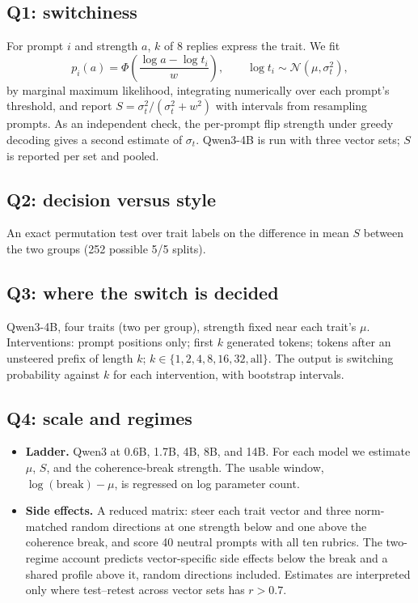 \documentclass[11pt]{article}
\begin{document}
\subsection{Q1: switchiness}
For prompt $i$ and strength $a$, $k$ of 8 replies express the trait. We fit
\[
  p_i(a) = \Phi\!\left(\frac{\log a - \log t_i}{w}\right),
  \qquad \log t_i \sim \mathcal{N}(\mu, \sigma_t^2),
\]
by marginal maximum likelihood, integrating numerically over each prompt's
threshold, and report $S = \sigma_t^2/(\sigma_t^2 + w^2)$ with intervals from
resampling prompts. As an independent check, the per-prompt flip strength under
greedy decoding gives a second estimate of $\sigma_t$. Qwen3-4B is run with
three vector sets; $S$ is reported per set and pooled.

\subsection{Q2: decision versus style}
An exact permutation test over trait labels on the difference in mean $S$
between the two groups (252 possible 5/5 splits).

\subsection{Q3: where the switch is decided}
Qwen3-4B, four traits (two per group), strength fixed near each trait's $\mu$.
Interventions: prompt positions only; first $k$ generated tokens; tokens after
an unsteered prefix of length $k$; $k \in \{1, 2, 4, 8, 16, 32, \text{all}\}$.
The output is switching probability against $k$ for each intervention, with
bootstrap intervals.

\subsection{Q4: scale and regimes}
\begin{itemize}
  \item \textbf{Ladder.} Qwen3 at 0.6B, 1.7B, 4B, 8B, and 14B. For each model
        we estimate $\mu$, $S$, and the coherence-break strength. The usable
        window, $\log(\text{break}) - \mu$, is regressed on log parameter
        count.
  \item \textbf{Side effects.} A reduced matrix: steer each trait vector and
        three norm-matched random directions at one strength below and one
        above the coherence break, and score 40 neutral prompts with all ten
        rubrics. The two-regime account predicts vector-specific side effects
        below the break and a shared profile above it, random directions
        included. Estimates are interpreted only where test--retest across
        vector sets has $r > 0.7$.
\end{itemize}
\end{document}
